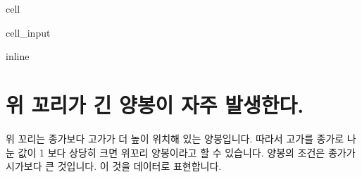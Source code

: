 \documentclass[letterpaper,10pt,english]{jupyterBook}
\begin{document}
\begin{sphinxuseclass}{cell}\begin{sphinxVerbatimInput}

\begin{sphinxuseclass}{cell_input}
\begin{sphinxVerbatim}[commandchars=\\\{\}]
   
 inline
   
   
   
 

  
\end{sphinxVerbatim}

\end{sphinxuseclass}\end{sphinxVerbatimInput}

\end{sphinxuseclass}

\section{위 꼬리가 긴 양봉이 자주 발생한다.}
\label{\detokenize{chapter5/5.1.3_Hypothesis_3:id1}}\label{\detokenize{chapter5/5.1.3_Hypothesis_3::doc}}
\sphinxAtStartPar
위 꼬리는 종가보다 고가가 더 높이 위치해 있는 양봉입니다. 따라서 고가를 종가로 나눈 값이 1 보다 상당히 크면 위꼬리 양봉이라고 할 수 있습니다. 양봉의 조건은 종가가 시가보다 큰 것입니다. 이 것을 데이터로 표현합니다.
\end{document}
